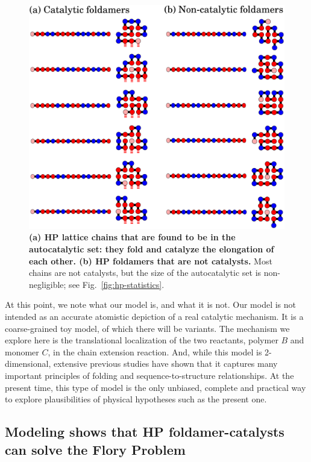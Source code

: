 \documentclass[journal=jacsat,manuscript=article,layout=twocolumn]{achemso}
\begin{document}
\begin{figure}[htb!]
  \centering
  \includegraphics[width=\columnwidth]{pictures/fold-cat.pdf} 
  \caption{\footnotesize{\textbf{(a) HP lattice chains that are found to be in the autocatalytic 
set: they fold and catalyze the elongation of each other.  (b) HP foldamers that are not 
catalysts.}  Most chains are not catalysts, but the size of the autocatalytic set is 
non-negligible; see Fig.~\ref{fig:hp-statistics}.}}
  \label{fig:fold-cat}
\end{figure}

 At this point, we note what our model is, and what it is not.  Our model is not intended as an 
 accurate atomistic depiction of a real catalytic mechanism.  It is a coarse-grained toy model, of 
which there will be variants.  The mechanism we explore here is the translational localization of 
the two reactants, polymer $B$ and monomer $C$, in the chain extension reaction.  And, while this 
model is 2-dimensional, extensive previous studies have shown that it captures many important 
principles of folding and sequence-to-structure relationships.  At the present time, this type of 
model is the only unbiased, complete and practical way to explore plausibilities of physical 
hypotheses such as the present one.


\subsection{Modeling shows that HP foldamer-catalysts can solve the Flory Problem}
\end{document}
